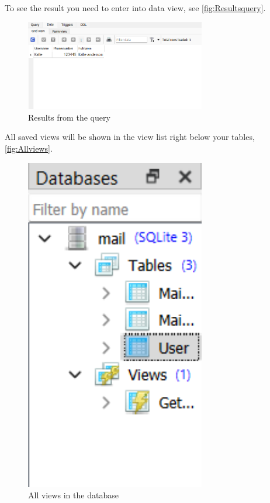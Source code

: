 \documentclass[a4paper,11pt,oneside]{article}
\begin{document}
\begin{sloppypar}
To see the result you need to enter into data view, see \autoref{fig:Resultsquery}.
\begin{figure}[!htb]
  \centering
  \includegraphics[width=0.7\textwidth]{sqlitestudio/queries/create_query_find_results.png}
  \caption{Results from the query} 
  \label{fig:Resultsquery}
\end{figure} 
All saved views will be shown in the view list right below your tables, \autoref{fig:Allviews}.  
\begin{figure}[!htb]
  \centering
  \includegraphics[width=0.7\textwidth]{sqlitestudio/queries/create_query_find_views.png}
  \caption{All views in the database} 
  \label{fig:Allviews}
\end{figure} 


\end{sloppypar}
\end{document}
